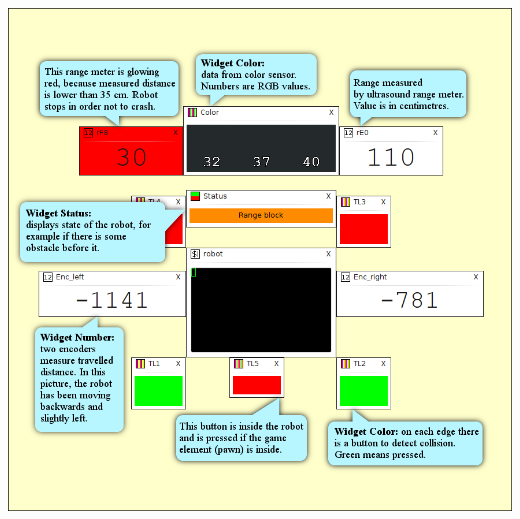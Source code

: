 \documentclass[17pt]{extreport}
\begin{document}
\vspace{30mm}
\begin{center}
\includegraphics{img/sensors2.png}
\end{center}
\end{document}
